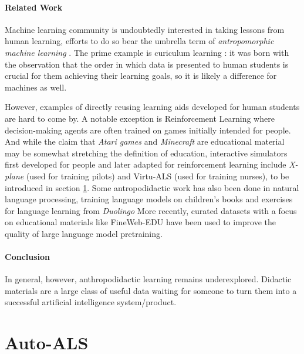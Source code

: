 \paragraph{Related Work}

Machine learning community is undoubtedly interested in taking lessons from human learning, efforts to do so bear the umbrella term of \emph{antropomorphic
machine learning} \cite{angelovAnthropomorphicMachineLearning2018}. The prime example is curiculum learning \cite{sovianyCurriculumLearningSurvey2022, zhouCurBenchCurriculumLearning2024}: it was born with the observation that the order in which data is presented to human students is crucial for them achieving their learning goals, so it is likely a difference for machines as well.

However, examples of directly reusing learning aids developed for human students are hard to come by. A notable exception is Reinforcement Learning where decision-making agents are often trained on games initially intended for people. And while the claim that \emph{Atari games} \cite{mnihPlayingAtariDeep2013} and 
\emph{Minecraft} \cite{hofmannMinecraftAIPlayground2019} are educational material may be somewhat stretching the definition of education, interactive simulators first developed for people and later adapted for reinforcement learning include \emph{X-plane} \cite{staudingerXPlaneMLEnvironmentLearning2018} (used for training pilots) and Virtu-ALS (used for training nurses), to be introduced in section \ref{sec:auto-als}. 
Some antropodidactic work has also been done in natural language processing, training language models on children's books \cite{mayhewSimultaneousTranslationParaphrase2020} and exercises for language learning from \emph{Duolingo} \cite{mayhewSimultaneousTranslationParaphrase2020}
More recently, curated datasets with a focus on educational materials like FineWeb-EDU \cite{penedoFineWebDatasetsDecanting2024} have been used to improve the quality of large language model pretraining.

\paragraph{Conclusion}

In general, however, anthropodidactic learning remains underexplored. 
Didactic materials are a large class of useful data waiting for someone to turn them into a successful artificial intelligence system/product.

\newpage
\section{Auto-ALS}
\label{sec:auto-als}

